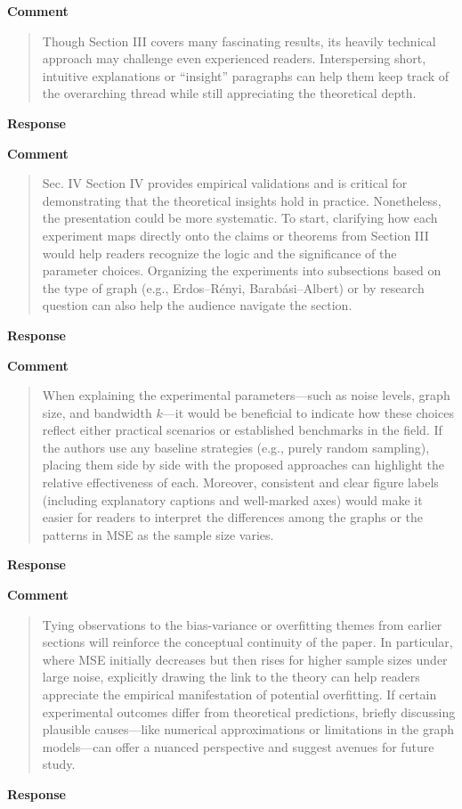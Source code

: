 \documentclass[11pt,onecolumn,journal]{IEEEtran}
\begin{document}
\textbf{Comment}
\begin{quote}
Though Section III covers many fascinating results, its heavily technical approach may challenge even experienced readers. Interspersing short, intuitive explanations or “insight” paragraphs can help them keep track of the overarching thread while still appreciating the theoretical depth.

\end{quote}
\textbf{Response}


\textbf{Comment}
\begin{quote}
Sec. IV
Section IV provides empirical validations and is critical for demonstrating that the theoretical insights hold in practice. Nonetheless, the presentation could be more systematic. To start, clarifying how each experiment maps directly onto the claims or theorems from Section III would help readers recognize the logic and the significance of the parameter choices. Organizing the experiments into subsections based on the type of graph (e.g., Erdos–Rényi, Barabási–Albert) or by research question can also help the audience navigate the section.

\end{quote}
\textbf{Response}


\textbf{Comment}
\begin{quote}
When explaining the experimental parameters—such as noise levels, graph size, and bandwidth $k$—it would be beneficial to indicate how these choices reflect either practical scenarios or established benchmarks in the field. If the authors use any baseline strategies (e.g., purely random sampling), placing them side by side with the proposed approaches can highlight the relative effectiveness of each. Moreover, consistent and clear figure labels (including explanatory captions and well-marked axes) would make it easier for readers to interpret the differences among the graphs or the patterns in MSE as the sample size varies.

\end{quote}
\textbf{Response}


\textbf{Comment}
\begin{quote}
Tying observations to the bias-variance or overfitting themes from earlier sections will reinforce the conceptual continuity of the paper. In particular, where MSE initially decreases but then rises for higher sample sizes under large noise, explicitly drawing the link to the theory can help readers appreciate the empirical manifestation of potential overfitting. If certain experimental outcomes differ from theoretical predictions, briefly discussing plausible causes—like numerical approximations or limitations in the graph models—can offer a nuanced perspective and suggest avenues for future study.

\end{quote}
\textbf{Response}
\end{document}
